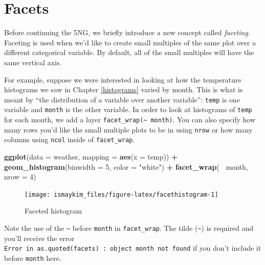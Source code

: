 \documentclass[12pt,]{krantz}
\makeatletter
\newenvironment{Shaded}{\begin{snugshade}}{\end{snugshade}}
\newcommand{\KeywordTok}[1]{\textcolor[rgb]{0.27,0.27,0.27}{\textbf{#1}}}
\newcommand{\DataTypeTok}[1]{\textcolor[rgb]{0.27,0.27,0.27}{#1}}
\newcommand{\DecValTok}[1]{\textcolor[rgb]{0.06,0.06,0.06}{#1}}
\newcommand{\StringTok}[1]{\textcolor[rgb]{0.5,0.5,0.5}{#1}}
\newcommand{\OperatorTok}[1]{\textcolor[rgb]{0.43,0.43,0.43}{\textbf{#1}}}
\newcommand{\NormalTok}[1]{#1}
\newenvironment{kframe}{%
\medskip{}
\setlength{\fboxsep}{.8em}
 \def\at@end@of@kframe{}%
 \ifinner\ifhmode%
  \def\at@end@of@kframe{\end{minipage}}%
  \begin{minipage}{\columnwidth}%
 \fi\fi%
 \def\FrameCommand##1{\hskip\@totalleftmargin \hskip-\fboxsep
 \colorbox{shadecolor}{##1}\hskip-\fboxsep
     \hskip-\linewidth \hskip-\@totalleftmargin \hskip\columnwidth}%
 \MakeFramed {\advance\hsize-\width
   \@totalleftmargin\z@ \linewidth\hsize
   \@setminipage}}%
 {\par\unskip\endMakeFramed%
 \at@end@of@kframe}
\renewenvironment{Shaded}{\begin{kframe}}{\end{kframe}}
\makeatother
\begin{document}
\section{Facets}\label{facets}

Before continuing the 5NG, we briefly introduce a new concept called
\emph{faceting}. Faceting is used when we'd like to create small
multiples of the same plot over a different categorical variable. By
default, all of the small multiples will have the same vertical axis.

For example, suppose we were interested in looking at how the
temperature histograms we saw in Chapter \ref{histograms} varied by
month. This is what is meant by ``the distribution of a variable over
another variable'': \texttt{temp} is one variable and \texttt{month} is
the other variable. In order to look at histograms of \texttt{temp} for
each month, we add a layer
\texttt{facet\_wrap(\textasciitilde{}\ month)}. You can also specify how
many rows you'd like the small multiple plots to be in using
\texttt{nrow} or how many columns using \texttt{ncol} inside of
\texttt{facet\_wrap}.

\begin{Shaded}
\begin{Highlighting}[]
\KeywordTok{ggplot}\NormalTok{(}\DataTypeTok{data =}\NormalTok{ weather, }\DataTypeTok{mapping =} \KeywordTok{aes}\NormalTok{(}\DataTypeTok{x =}\NormalTok{ temp)) }\OperatorTok{+}
\StringTok{  }\KeywordTok{geom_histogram}\NormalTok{(}\DataTypeTok{binwidth =} \DecValTok{5}\NormalTok{, }\DataTypeTok{color =} \StringTok{"white"}\NormalTok{) }\OperatorTok{+}
\StringTok{  }\KeywordTok{facet_wrap}\NormalTok{(}\OperatorTok{~}\StringTok{ }\NormalTok{month, }\DataTypeTok{nrow =} \DecValTok{4}\NormalTok{)}
\end{Highlighting}
\end{Shaded}

\begin{figure}

{\centering \texttt{[image: ismaykim\_files/figure-latex/facethistogram-1]} 

}

\caption{Faceted histogram}\label{fig:facethistogram}
\end{figure}

Note the use of the \texttt{\textasciitilde{}} before \texttt{month} in
\texttt{facet\_wrap}. The tilde (\texttt{\textasciitilde{}}) is required
and you'll receive the error
\texttt{Error\ in\ as.quoted(facets)\ :\ object\ \textquotesingle{}month\textquotesingle{}\ not\ found}
if you don't include it before \texttt{month} here.
\end{document}
